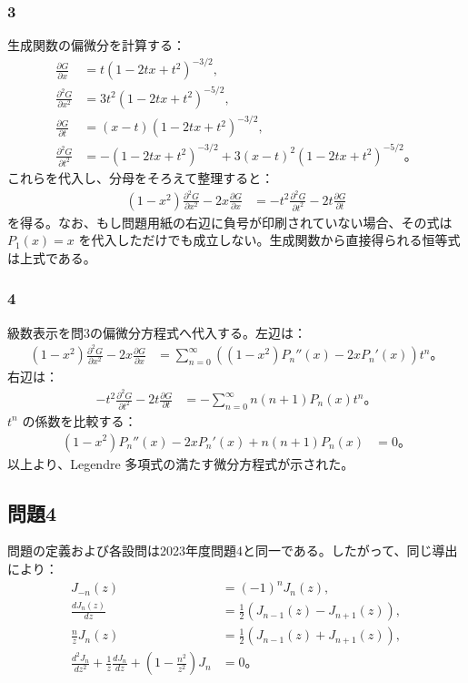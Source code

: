 \documentclass[platex,dvipdfmx,a4paper]{jsarticle}
\newcommand{\hb}[2]{\frac{\partial #1}{\partial #2}}
\newcommand{\bbn}[2]{\frac{d #1}{d #2}}
\newcommand{\nhb}[3]{\frac{\partial^{#1} #2}{\partial #3^{#1}}}
\newcommand{\nbbn}[3]{\frac{d^{#1} #2}{d #3^{#1}}}
\begin{document}
\subsubsection*{3}

生成関数の偏微分を計算する：
\begin{align*}
  \hb{G}{x}
  &=t(1-2tx+t^2)^{-3/2},\\
  \nhb{2}{G}{x}
  &=3t^2(1-2tx+t^2)^{-5/2},\\
  \hb{G}{t}
  &=(x-t)(1-2tx+t^2)^{-3/2},\\
  \nhb{2}{G}{t}
  &=-(1-2tx+t^2)^{-3/2}
    +3(x-t)^2(1-2tx+t^2)^{-5/2}。
\end{align*}
これらを代入し、分母をそろえて整理すると：
\begin{align*}
  (1-x^2)\nhb{2}{G}{x}-2x\hb{G}{x}
  &=-t^2\nhb{2}{G}{t}-2t\hb{G}{t}
\end{align*}
を得る。なお、もし問題用紙の右辺に負号が印刷されていない場合、その式は $P_1(x)=x$ を代入しただけでも成立しない。生成関数から直接得られる恒等式は上式である。

\subsubsection*{4}

級数表示を問3の偏微分方程式へ代入する。左辺は：
\begin{align*}
  (1-x^2)\nhb{2}{G}{x}-2x\hb{G}{x}
  &=\sum_{n=0}^{\infty}\left((1-x^2)P_n''(x)-2xP_n'(x)\right)t^n。
\end{align*}
右辺は：
\begin{align*}
  -t^2\nhb{2}{G}{t}-2t\hb{G}{t}
  &=-\sum_{n=0}^{\infty}n(n+1)P_n(x)t^n。
\end{align*}
$t^n$ の係数を比較する：
\begin{align*}
  (1-x^2)P_n''(x)-2xP_n'(x)+n(n+1)P_n(x)
  &=0。
\end{align*}
以上より、Legendre 多項式の満たす微分方程式が示された。

\subsection*{問題4}

問題の定義および各設問は2023年度問題4と同一である。したがって、同じ導出により：
\begin{align*}
  J_{-n}(z)
  &=(-1)^nJ_n(z),\\
  \bbn{J_n(z)}{z}
  &=\frac{1}{2}\left(J_{n-1}(z)-J_{n+1}(z)\right),\\
  \frac{n}{z}J_n(z)
  &=\frac{1}{2}\left(J_{n-1}(z)+J_{n+1}(z)\right),\\
  \nbbn{2}{J_n}{z}
  +\frac{1}{z}\bbn{J_n}{z}
  +\left(1-\frac{n^2}{z^2}\right)J_n
  &=0。
\end{align*}
\end{document}
